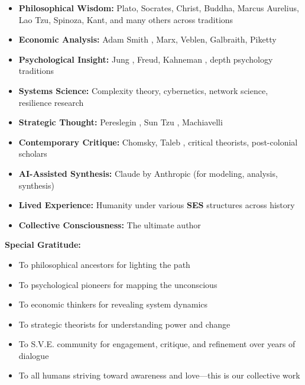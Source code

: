 \documentclass[11pt,a4paper]{article}
\newcommand{\SES}{\textbf{SES}}
\theoremstyle{definition}
\theoremstyle{remark}
\begin{document}
\begin{itemize}
    \item \textbf{Philosophical Wisdom:} Plato, Socrates, Christ, Buddha, Marcus Aurelius, Lao Tzu, Spinoza, Kant, and many others across traditions
    
    \item \textbf{Economic Analysis:} Adam Smith \citep{smith1776wealth}, Marx, Veblen, Galbraith, Piketty \citep{piketty2014capital}
    
    \item \textbf{Psychological Insight:} Jung \citep{jung1969collective}, Freud, Kahneman \citep{kahneman2011thinking}, depth psychology traditions
    
    \item \textbf{Systems Science:} Complexity theory, cybernetics, network science, resilience research
    
    \item \textbf{Strategic Thought:} Pereslegin \citep{pereslegin2005summa}, Sun Tzu \citep{suntzu_artofwar}, Machiavelli \citep{machiavelli1532prince}
    
    \item \textbf{Contemporary Critique:} Chomsky, Taleb \citep{taleb2012antifragile}, critical theorists, post-colonial scholars
    
    \item \textbf{AI-Assisted Synthesis:} Claude by Anthropic (for modeling, analysis, synthesis)
    
    \item \textbf{Lived Experience:} Humanity under various \SES{} structures across history
    
    \item \textbf{Collective Consciousness:} The ultimate author
\end{itemize}

\textbf{Special Gratitude:}
\begin{itemize}
    \item To philosophical ancestors for lighting the path
    \item To psychological pioneers for mapping the unconscious
    \item To economic thinkers for revealing system dynamics
    \item To strategic theorists for understanding power and change
    \item To S.V.E. community for engagement, critique, and refinement over years of dialogue
    \item To all humans striving toward awareness and love---this is our collective work
\end{itemize}
\end{document}
